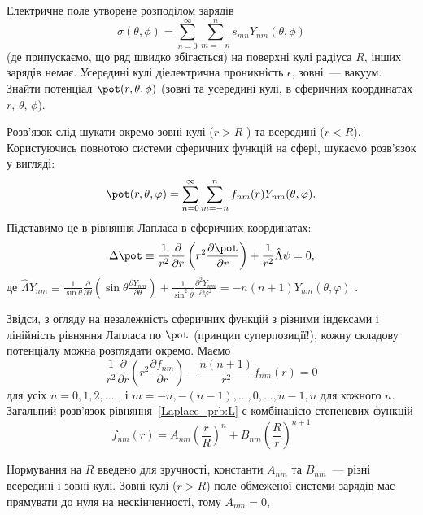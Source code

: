 \begin{problem}\label{prb:L}
Електричне поле утворене розподілом зарядів
\[
	\sigma(\theta, \phi) = \sum\limits_{n=0}^{\infty}\sum\limits_{m = -n}^ns_{mn}Y_{nm}(\theta, \phi)
\]
(де припускаємо, що ряд швидко збігається)  на поверхні кулі радіуса $R$, інших зарядів немає. Усередині кулі діелектрична проникність $\epsilon$, зовні~--- вакуум. Знайти потенціал  $\pot(r,\theta,\phi)$ (зовні та усередині кулі, в сферичних координатах  $r$, $\theta$, $\phi$).
\begin{solution}
	Розв'язок слід шукати окремо зовні кулі ($r >R$ ) та всередині ($r<R$). Користуючись повнотою системи сферичних функцій на сфері, шукаємо розв’язок у вигляді:
	\[
		\pot(r,\theta ,\varphi ) = \sum\limits_{n = 0}^\infty  {\sum\limits_{m =  - n}^n {{f_{nm}}(r){Y_{nm}}(\theta ,\varphi )} } .
	\]
	Підставимо це в рівняння Лапласа в сферичних координатах:
	\begin{equation}\label{Laplace_prb:L}
		\Delta \pot  \equiv \frac{1}{{{r^2}}}\frac{\partial }{{\partial r}}\left( {{r^2}\frac{{\partial \pot }}{{\partial r}}} \right) + \frac{1}{{{r^2}}}\hat \Lambda \psi  = 0,
	\end{equation}
	де \(\hat \Lambda {Y_{nm}} \equiv \frac{1}{{\sin \theta }}\frac{\partial }{{\partial \theta }}\left( {\sin \theta \frac{{\partial {Y_{nm}}}}{{\partial \theta }}} \right) + \frac{1}{{{{\sin }^2}\theta }}\frac{{{\partial ^2}{Y_{nm}}}}{{\partial {\varphi ^2}}} =  - n\left( {n + 1} \right){Y_{nm}}\left( {\theta ,\varphi } \right)\) .

	Звідси, з огляду на незалежність сферичних функцій з різними індексами і лінійність рівняння Лапласа по $\pot$  (принцип суперпозиції!), кожну складову потенціалу можна розглядати окремо. Маємо
	\[
		\frac{1}{{{r^2}}}\frac{\partial }{{\partial r}}\left( {{r^2}\frac{{\partial {f_{nm}}}}{{\partial r}}} \right) - \frac{{n\left( {n + 1} \right)}}{{{r^2}}}{f_{nm}}(r) = 0
	\]
	для усіх $n= 0,1,2,\ldots$ , і $m = -n, -(n-1), \ldots, 0, \ldots, n-1, n$  для кожного $n$.
	Загальний розв’язок рівняння~\eqref{Laplace_prb:L} є комбінацією степеневих функцій
	\begin{equation}\label{star_prb:L}
		f_{nm}(r) = A_{nm}{\left( {\frac{r}{R}} \right)^n} + {B_{nm}}{\left( {\frac{R}{r}} \right)^{n + 1}}
	\end{equation}

	Нормування на $R$ введено для зручності, константи $A_{nm}$ та $B_{nm}$~--- різні всередині і зовні кулі.
	Зовні кулі ($r >R$) поле обмеженої системи зарядів має прямувати до нуля на нескінченності, тому $A_{nm} = 0$,


\end{solution}
\end{problem}
